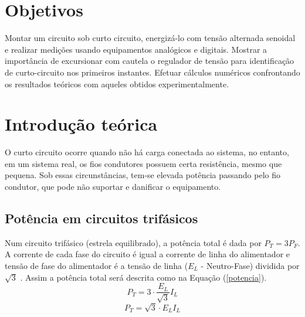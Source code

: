 \documentclass[a4paper,12pt,oneside,openany,table,xcdraw]{article}
\begin{document}
\newcommand{\thedepartment}{Faculdade de Engenharia Elétrica}
\newcommand{\thecourse}{FEELT}
\newcommand{\thetitle}{TENSÃO E CORRENTE DE CURTO-CIRCUITO EM REGULADOR DE TENSÃO SENOIDAL}
\newcommand{\thetype}{Relatório da Disciplina de Circuitos Elétricos II}
\newcommand{\theproftitle}{Bacharel em Engenharia Elétrica}
\newcommand{\thestudent}{Lesly Viviane Montúfar Berrios\\
\centering11811ETE001}
\newcommand{\theadvisor}{Prof. Wellington Maycon Santos Bernardes}
\newcommand{\thecity}{Uberlândia}

\thispagestyle{empty}


\onehalfspacing
\tableofcontents %
\newpage

\section{Objetivos} %
Montar um circuito sob curto circuito, energizá-lo com tensão alternada senoidal e realizar medições usando equipamentos analógicos e digitais. Mostrar a importância de excursionar com cautela o regulador de tensão para identificação de curto-circuito nos primeiros instantes. Efetuar cálculos numéricos confrontando os resultados teóricos com aqueles obtidos experimentalmente.

\section{Introdução teórica} %
O curto circuito ocorre quando não há carga conectada ao sistema, no entanto, em um sistema real, os fios condutores possuem certa resistência, mesmo que pequena. Sob essas circunstâncias, tem-se elevada potência passando pelo fio condutor, que pode não suportar e danificar o equipamento. 

\subsection{Potência em circuitos trifásicos}
Num circuito trifásico (estrela equilibrado), a potência total é dada por $P_{T}=3P_{F}$. A corrente de cada fase do circuito é igual a corrente de linha do alimentador e tensão de fase do alimentador é a tensão de linha ($E_{L}$ - Neutro-Fase) dividida por $\sqrt{3}$ \cite{irwin}. Assim a potência total será descrita como na Equação (\ref{potencia}).
\begin{equation*}
P_{T}=3\cdot \dfrac{E_{L}}{\sqrt{3}} I_{L}
\end{equation*}
\begin{equation}\label{potencia}
P_{T}=\sqrt{3}\cdot E_{L} I_{L}
\end{equation}
\end{document}
